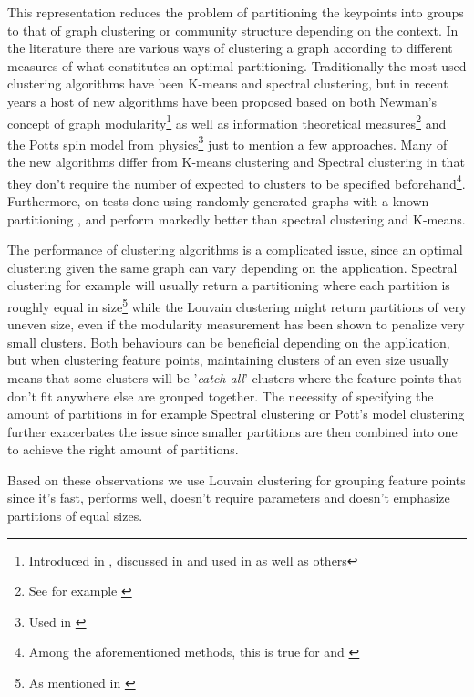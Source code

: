 \documentclass{article}
\begin{document}
This representation reduces the problem of partitioning the keypoints 
into groups to that of graph clustering or community structure depending 
on the context. In the literature there are various ways of clustering a 
graph according to different measures of what constitutes an optimal 
partitioning. Traditionally the most used clustering algorithms have 
been K-means and spectral clustering, but in recent years a host of new 
algorithms have been proposed based on both Newman's concept of graph 
modularity\footnote{Introduced in \cite{girvan2002}, discussed in 
\cite{brandes2007} and used in \cite{blondel2008} as well as others} as 
well as information theoretical measures\footnote{See for example 
\cite{rosvall2008}} and the Potts spin model from physics\footnote{Used 
in \cite{ronhovde2009}} just to mention a few approaches. Many of the 
new algorithms differ from K-means clustering and Spectral clustering in 
that they don't require the number of expected to clusters to be 
specified beforehand\footnote{Among the aforementioned methods, this is 
true for \cite{blondel2008} and \cite{rosvall2008}}.  Furthermore, on 
tests done using randomly generated graphs with a known partitioning 
\cite{blondel2008}, \cite{rosvall2008} and \cite{ronhovde2009} perform 
markedly better than spectral clustering and 
K-means\cite{lancichinetti2009}.

The performance of clustering algorithms is a complicated issue, since 
an optimal clustering given the same graph can vary depending on the 
application. Spectral clustering for example will usually return a 
partitioning where each partition is roughly equal in size\footnote{As 
mentioned in \cite{von2007}} while the Louvain 
clustering\cite{blondel2008} might return partitions of very uneven 
size, even if the modularity measurement has been shown to penalize very 
small clusters\cite{brandes2007}. Both behaviours can be beneficial 
depending on the application, but when clustering feature points, 
maintaining clusters of an even size usually means that some clusters 
will be '\emph{catch-all}' clusters where the feature points that don't 
fit anywhere else are grouped together. The necessity of specifying the 
amount of partitions in for example Spectral clustering or Pott's model 
clustering further exacerbates the issue since smaller partitions are 
then combined into one to achieve the right amount of partitions.

Based on these observations we use Louvain clustering for grouping 
feature points since it's fast, performs well, doesn't require 
parameters and doesn't emphasize partitions of equal sizes.
\end{document}
